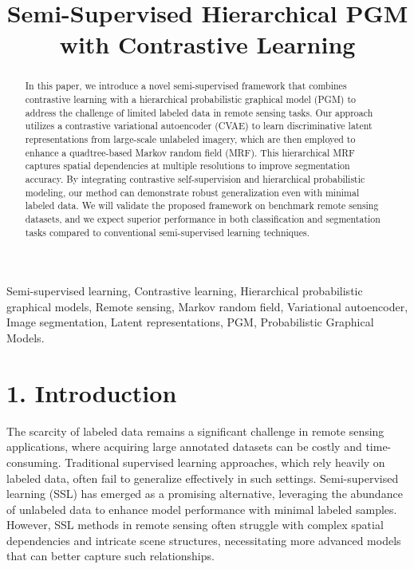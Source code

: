 \documentclass[conference]{IEEEtran}
\title{Semi-Supervised Hierarchical PGM with Contrastive Learning}
\author{
    \IEEEauthorblockN{Leonard Niyitegeka}
    \IEEEauthorblockA{Carnegie Mellon University Africa\\
    Email: lniyiteg@andrew.cmu.edu}
    \and
    \IEEEauthorblockN{Jules Udahemuka}
    \IEEEauthorblockA{Carnegie Mellon University Africa\\
    Email: judahemu@andrew.cmu.edu}
}
\begin{document}
\maketitle

\begin{abstract}
    In this paper, we introduce a novel semi-supervised framework that combines contrastive learning with a hierarchical probabilistic graphical model (PGM) to address the challenge of limited labeled data in remote sensing tasks. Our approach utilizes a contrastive variational autoencoder (CVAE) to learn discriminative latent representations from large-scale unlabeled imagery, which are then employed to enhance a quadtree-based Markov random field (MRF). This hierarchical MRF captures spatial dependencies at multiple resolutions to improve segmentation accuracy. By integrating contrastive self-supervision and hierarchical probabilistic modeling, our method can demonstrate robust generalization even with minimal labeled data. We will validate the proposed framework on benchmark remote sensing datasets, and we expect superior performance in both classification and segmentation tasks compared to conventional semi-supervised learning techniques.
\end{abstract}
\vspace{0.5cm}

\begin{IEEEkeywords}
    Semi-supervised learning, Contrastive learning, Hierarchical probabilistic graphical models, Remote sensing, Markov random field, Variational autoencoder, Image segmentation, Latent representations, PGM, Probabilistic Graphical Models.
\end{IEEEkeywords}

\section*{1. Introduction}

The scarcity of labeled data remains a significant challenge in remote sensing applications, where acquiring large annotated datasets can be costly and time-consuming\cite{paris2023remote}. Traditional supervised learning approaches, which rely heavily on labeled data, often fail to generalize effectively in such settings. Semi-supervised learning (SSL) has emerged as a promising alternative, leveraging the abundance of unlabeled data to enhance model performance with minimal labeled samples\cite{patel2022evaluating}. However, SSL methods in remote sensing often struggle with complex spatial dependencies and intricate scene structures, necessitating more advanced models that can better capture such relationships\cite{pastorino2021semantic}.
\end{document}
